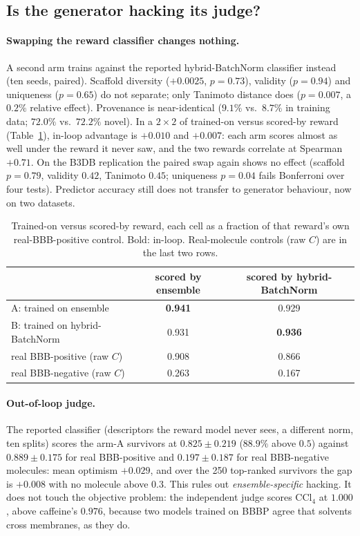 \documentclass[10pt,letterpaper]{article}
\begin{document}
\subsection{Is the generator hacking its judge?}
\paragraph{Swapping the reward classifier changes nothing.} A second arm trains against the reported hybrid-BatchNorm classifier instead (ten seeds, paired). Scaffold diversity ($+0.0025$, $p=0.73$), validity ($p=0.94$) and uniqueness ($p=0.65$) do not separate; only Tanimoto distance does ($p=0.007$, a $0.2\%$ relative effect). Provenance is near-identical ($9.1\%$ vs.\ $8.7\%$ in training data; $72.0\%$ vs.\ $72.2\%$ novel). In a $2\times2$ of trained-on versus scored-by reward (Table~\ref{tab:cross}), in-loop advantage is $+0.010$ and $+0.007$: each arm scores almost as well under the reward it never saw, and the two rewards correlate at Spearman $+0.71$. On the B3DB replication the paired swap again shows no effect (scaffold $p=0.79$, validity $0.42$, Tanimoto $0.45$; uniqueness $p=0.04$ fails Bonferroni over four tests). Predictor accuracy still does not transfer to generator behaviour, now on two datasets.

\begin{table}[t]
\centering
\caption{Trained-on versus scored-by reward, each cell as a fraction of that reward's own real-BBB-positive control. Bold: in-loop. Real-molecule controls (raw $C$) are in the last two rows.}
\label{tab:cross}
\begin{tabular}{@{}lcc@{}}\toprule
& scored by ensemble & scored by hybrid-BatchNorm\\\midrule
A: trained on ensemble & \textbf{0.941} & 0.929\\
B: trained on hybrid-BatchNorm & 0.931 & \textbf{0.936}\\
real BBB-positive (raw $C$) & 0.908 & 0.866\\
real BBB-negative (raw $C$) & 0.263 & 0.167\\\bottomrule
\end{tabular}
\end{table}
\paragraph{Out-of-loop judge.} The reported classifier (descriptors the reward model never sees, a different norm, ten splits) scores the arm-A survivors at $0.825\pm0.219$ ($88.9\%$ above $0.5$) against $0.889\pm0.175$ for real BBB-positive and $0.197\pm0.187$ for real BBB-negative molecules: mean optimism $+0.029$, and over the 250 top-ranked survivors the gap is $+0.008$ with no molecule above $0.3$. This rules out \emph{ensemble-specific} hacking. It does not touch the objective problem: the independent judge scores CCl$_4$ at $1.000$, above caffeine's $0.976$, because two models trained on BBBP agree that solvents cross membranes, as they do.
\end{document}
